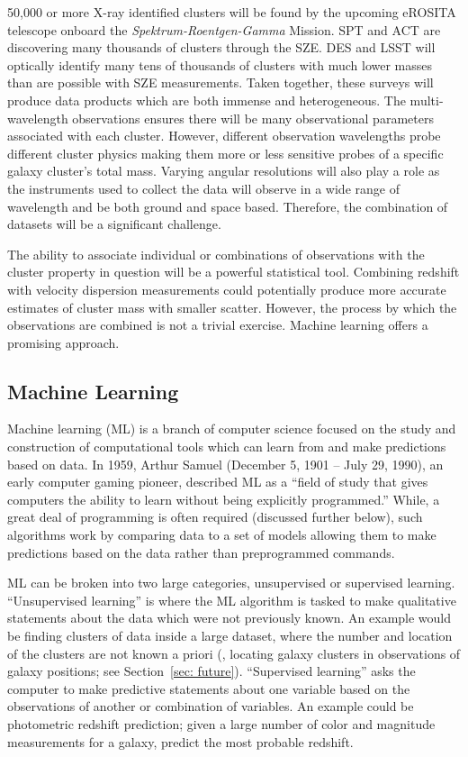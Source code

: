 50,000 or more X-ray identified clusters will be found by the upcoming eROSITA telescope onboard the \emph{Spektrum-Roentgen-Gamma} Mission. SPT and ACT are discovering many thousands of clusters through the SZE. DES and LSST will optically identify many tens of thousands of clusters with much lower masses than are possible with SZE measurements. Taken together, these surveys will produce data products which are both immense and heterogeneous. The multi-wavelength observations ensures there will be many observational parameters associated with each cluster. However, different observation wavelengths probe different cluster physics making them more or less sensitive probes of a specific galaxy cluster's total mass. Varying angular resolutions will also play a role as the instruments used to collect the data will observe in a wide range of wavelength and be both ground and space based. Therefore, the combination of datasets will be a significant challenge.

The ability to associate individual or combinations of observations with the cluster property in question will be a powerful statistical tool. Combining redshift with velocity dispersion measurements could potentially produce more accurate estimates of cluster mass with smaller scatter. However, the process by which the observations are combined is not a trivial exercise. Machine learning offers a promising approach.

\subsection{Machine Learning}
Machine learning (ML) is a branch of computer science focused on the study and construction of computational tools which can learn from and make predictions based on data. In 1959, Arthur Samuel (December 5, 1901 -- July 29, 1990), an early computer gaming pioneer, described ML as a ``field of study that gives computers the ability to learn without being explicitly programmed.'' While, a great deal of programming is often required (discussed further below), such algorithms work by comparing data to a set of models allowing them to make predictions based on the data rather than preprogrammed commands.

ML can be broken into two large categories, unsupervised or supervised learning. ``Unsupervised learning'' is where the ML algorithm is tasked to make qualitative statements about the data which were not previously known. An example would be finding clusters of data inside a large dataset, where the number and location of the clusters are not known a priori (\eg, locating galaxy clusters in observations of galaxy positions; see Section~\ref{sec: future}). ``Supervised learning'' asks the computer to make predictive statements about one variable based on the observations of another or combination of variables. An example could be photometric redshift prediction; given a large number of color and magnitude measurements for a galaxy, predict the most probable redshift.  

